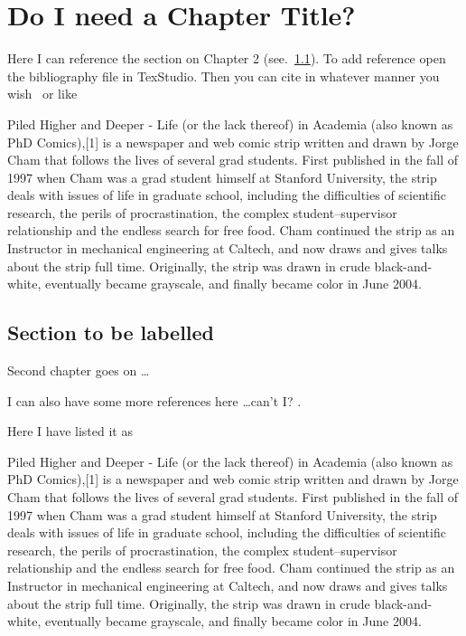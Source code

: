 \chapter{Do I need a Chapter Title?}

Here I can reference the section on Chapter 2 (see.~\ref{sec_label}). To add reference open the bibliography file in TexStudio. Then you can cite in whatever manner you wish~\citet{Agn2007} or like~\citep{Choi2005,Dasari2000,frisch1995}

Piled Higher and Deeper - Life (or the lack thereof) in Academia (also known as PhD Comics),[1] is a newspaper and web comic strip written and drawn by Jorge Cham that follows the lives of several grad students. First published in the fall of 1997 when Cham was a grad student himself at Stanford University, the strip deals with issues of life in graduate school, including the difficulties of scientific research, the perils of procrastination, the complex student–supervisor relationship and the endless search for free food. Cham continued the strip as an Instructor in mechanical engineering at Caltech, and now draws and gives talks about the strip full time. Originally, the strip was drawn in crude black-and-white, eventually became grayscale, and finally became color in June 2004.

\section{Section to be labelled}  \label{sec_label}
Second chapter goes on \dots

I can also have some more references here \dots can't I? \citet{Gallouat2010}.

Here I have listed it as \citep[see][]{mehta1994}

Piled Higher and Deeper - Life (or the lack thereof) in Academia (also known as PhD Comics),[1] is a newspaper and web comic strip written and drawn by Jorge Cham that follows the lives of several grad students. First published in the fall of 1997 when Cham was a grad student himself at Stanford University, the strip deals with issues of life in graduate school, including the difficulties of scientific research, the perils of procrastination, the complex student–supervisor relationship and the endless search for free food. Cham continued the strip as an Instructor in mechanical engineering at Caltech, and now draws and gives talks about the strip full time. Originally, the strip was drawn in crude black-and-white, eventually became grayscale, and finally became color in June 2004.

